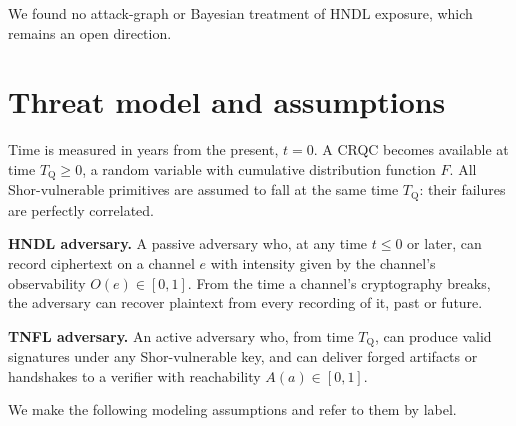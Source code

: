 \documentclass[conference]{IEEEtran}
\newcommand{\Tq}{T_{\mathrm{Q}}}
\newenvironment{envblock}{\par\smallskip\noindent\ignorespaces}{\par\smallskip}
\begin{document}
We found no attack-graph or Bayesian treatment of HNDL exposure, which remains an open direction.

\section{Threat model and assumptions}\label{sec:3}

Time is measured in years from the present, $t = 0$. A CRQC becomes available at time $\Tq \ge 0$, a random variable with cumulative distribution function $F$. All Shor-vulnerable primitives are assumed to fall at the same time $\Tq$: their failures are perfectly correlated.

\begin{envblock}

\textbf{HNDL adversary.} A passive adversary who, at any time $t \le 0$ or later, can record ciphertext on a channel $e$ with intensity given by the channel's observability $O(e) \in [0,1]$. From the time a channel's cryptography breaks, the adversary can recover plaintext from every recording of it, past or future.

\textbf{TNFL adversary.} An active adversary who, from time $\Tq$, can produce valid signatures under any Shor-vulnerable key, and can deliver forged artifacts or handshakes to a verifier with reachability $A(a) \in [0,1]$.
\end{envblock}

We make the following modeling assumptions and refer to them by label.
\end{document}
